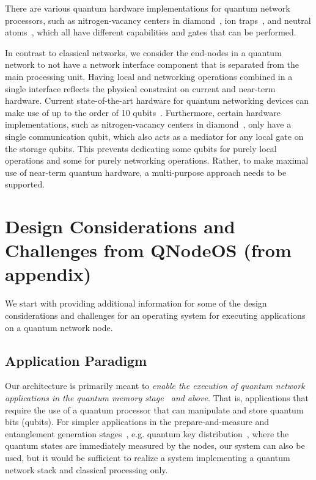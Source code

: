 There are various quantum hardware implementations for quantum network processors, such as nitrogen-vacancy centers in diamond~\cite{Bernien2014}, ion traps~\cite{moehring2007entanglement}, and neutral atoms~\cite{hofmann2012heralded,ritter2012elementary}, which all have different capabilities and gates that can be performed.

In contrast to classical networks, we consider the end-nodes in a quantum network to not have a network interface component that is separated from the main processing unit.
Having local and networking operations combined in a single interface reflects the physical constraint on current and near-term hardware.
Current state-of-the-art hardware for quantum networking devices can make use of up to the order of 10 qubits~\cite{bradley2019solidstate}.
Furthermore, certain hardware implementations, such as nitrogen-vacancy centers in diamond~\cite{Bernien2014}, only have a single communication qubit, which also acts as a mediator for any local gate on the storage qubits.
This prevents dedicating some qubits for purely local operations and some for purely networking operations.
Rather, to make maximal use of near-term quantum hardware, a multi-purpose approach needs to be supported.



\section{Design Considerations and Challenges from QNodeOS (from appendix)}

We start with providing additional information for some of the design considerations and challenges for an operating system for executing applications on a quantum network node.

\subsection{Application Paradigm}

Our architecture is primarily meant to \emph{enable the execution of quantum network applications in the quantum memory stage~\cite{wehner_2018_stages} and above}. That is, applications that require the use of a quantum processor that can manipulate and store quantum bits (qubits). For simpler applications in the prepare-and-measure and entanglement generation stages~\cite{wehner_2018_stages}, e.g. quantum key distribution~\cite{bb84Original,ekert_1991_e91}, where the quantum states are immediately measured by the nodes, our system can also be used, but it would be sufficient to realize a system implementing a quantum network stack and classical processing only.

